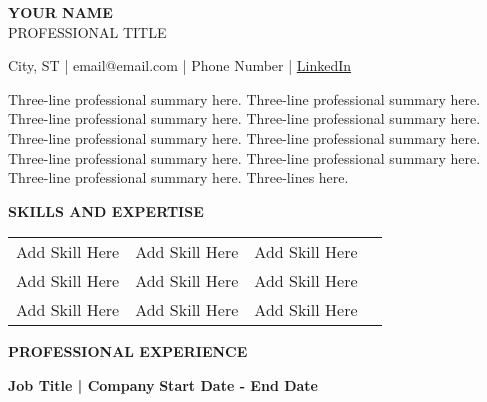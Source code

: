 \documentclass[11pt,letterpaper]{article}
\newcommand{\headertext}[1]{\begin{center}\textbf{\large #1}\end{center}}
\begin{document}

\begin{center}
    \Huge{\textbf{YOUR NAME}}\\[0.2cm]
    \large{PROFESSIONAL TITLE}\\[0.5cm]
\end{center}

\begin{center}
    City, ST \quad | \quad email@email.com \quad | \quad Phone Number \quad | \quad \href{https://linkedin.com}{LinkedIn}
\end{center}

\vspace{0.5cm}

\begin{small}
Three-line professional summary here. Three-line professional summary here. Three-line professional summary here. Three-line professional summary here. Three-line professional summary here. Three-line professional summary here. Three-line professional summary here. Three-line professional summary here. Three-line professional summary here. Three-lines here.
\end{small}

\vspace{0.5cm}

\headertext{SKILLS AND EXPERTISE}

\begin{center}
\begin{tabular}{p{}p{}p{}p{}}
Add Skill Here & Add Skill Here & Add Skill Here \\
Add Skill Here & Add Skill Here & Add Skill Here \\
Add Skill Here & Add Skill Here & Add Skill Here \\
\end{tabular}
\end{center}

\vspace{0.5cm}

\headertext{PROFESSIONAL EXPERIENCE}

\vspace{0.2cm}

\noindent\textbf{Job Title | Company} \hfill \textbf{Start Date - End Date}
\end{document}
